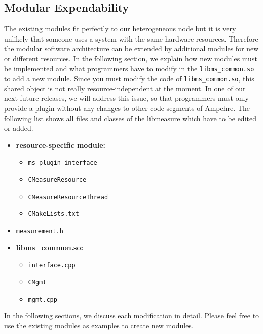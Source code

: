 \subsection{Modular Expendability}
The existing modules fit perfectly to our heterogeneous node but it is very unlikely that someone uses a system with the same hardware resources. Therefore the modular software architecture can be extended by additional modules for new or different resources. In the following section, we explain how new modules must be implemented and what programmers have to modify in the \texttt{libms\_common.so} to add a new module. Since you must modify the code of \texttt{libms\_common.so}, this shared object is not really resource-independent at the moment. In one of our next future releases, we will address this issue, so that programmers must only provide a plugin without any changes to other code segments of Ampehre. The following list shows all files and classes of the libmeasure which have to be edited or added.

\begin{itemize}
	\item \textbf{resource-specific module:}
	\begin{itemize}
		\item \texttt{ms\_plugin\_interface}
		\item \texttt{CMeasureResource}
		\item \texttt{CMeasureResourceThread}
		\item \texttt{CMakeLists.txt}
	\end{itemize}
	\item \texttt{measurement.h}
	
	\pagebreak
	
	\item \textbf{libms\_common.so:}
	\begin{itemize}
		\item \texttt{interface.cpp}
		\item \texttt{CMgmt}
		\item \texttt{mgmt.cpp} 
	\end{itemize}
\end{itemize}
In the following sections, we discuss each modification in detail. Please feel free to use the existing modules as examples to create new modules.

